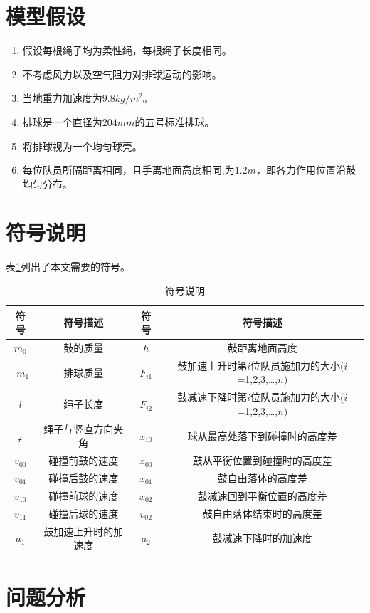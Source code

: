 \documentclass{cumcm}
\begin{document}
\section{模型假设}
\begin{enumerate}
\item 假设每根绳子均为柔性绳，每根绳子长度相同。
\item 不考虑风力以及空气阻力对排球运动的影响。
\item 当地重力加速度为$9.8kg/m^2$。
\item 排球是一个直径为$204mm$的五号标准排球。
\item 将排球视为一个均匀球壳。
\item 每位队员所隔距离相同，且手离地面高度相同,为$1.2m$，即各力作用位置沿鼓均匀分布。
\end{enumerate}

\section{符号说明}
表\ref{table-symbol}列出了本文需要的符号。
\begin{table}[H]
  \centering
  \caption{符号说明}\label{table-symbol}
  \begin{tabular*}{\textwidth}{c|c|c|c}
  \hline
  符号 & 符号描述 & 符号 & 符号描述\\
  \hline
  $m_0$ & 鼓的质量 & $h$ & 鼓距离地面高度\\\
  $m_1$ & 排球质量 & $F_{i1}$ & 鼓加速上升时第$i$位队员施加力的大小($i$=1,2,3,\dots,$n$)\\
  $l$ & 绳子长度& $F_{i2}$ & 鼓减速下降时第$i$位队员施加力的大小($i$=1,2,3,\dots,$n$)\\
  $\varphi$ & 绳子与竖直方向夹角 & $x_{10}$ & 球从最高处落下到碰撞时的高度差\\
  $v_{00}$ & 碰撞前鼓的速度 &  $x_{00}$ & 鼓从平衡位置到碰撞时的高度差\\
  $v_{01}$ & 碰撞后鼓的速度 &  $x_{01}$ & 鼓自由落体的高度差\\
  $v_{10}$ & 碰撞前球的速度 & $x_{02}$ & 鼓减速回到平衡位置的高度差\\
  $v_{11}$ & 碰撞后球的速度 & $v_{02}$ & 鼓自由落体结束时的高度差\\
  $a_1$ & 鼓加速上升时的加速度 & $a_2$ & 鼓减速下降时的加速度\\
  \hline
  \end{tabular*}
\end{table}


\section{问题分析}
\end{document}
